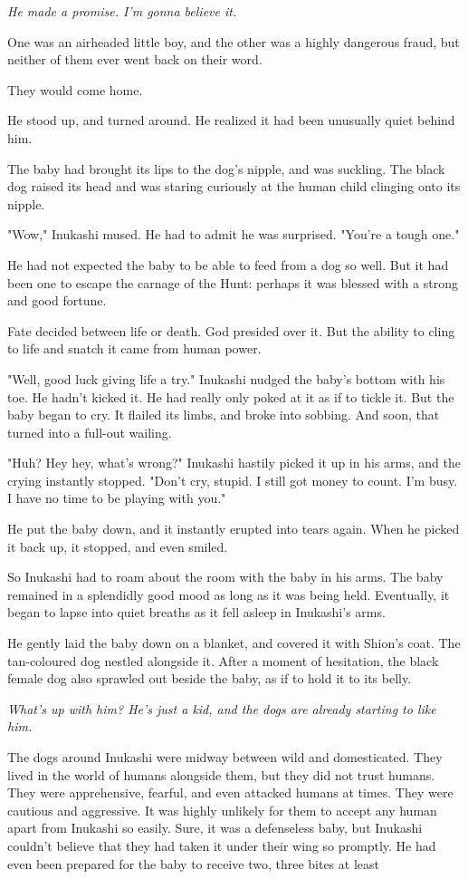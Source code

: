 \emph{He made a promise. I'm gonna believe it.}

One was an airheaded little boy, and the other was a highly dangerous
fraud, but neither of them ever went back on their word.

They would come home.

He stood up, and turned around. He realized it had been unusually quiet
behind him.

The baby had brought its lips to the dog's nipple, and was suckling. The
black dog raised its head and was staring curiously at the human child
clinging onto its nipple.

"Wow," Inukashi mused. He had to admit he was surprised. "You're a tough
one."

He had not expected the baby to be able to feed from a dog so well. But
it had been one to escape the carnage of the Hunt: perhaps it was
blessed with a strong and good fortune.

Fate decided between life or death. God presided over it. But the
ability to cling to life and snatch it came from human power.

"Well, good luck giving life a try." Inukashi nudged the baby's bottom
with his toe. He hadn't kicked it. He had really only poked at it as if
to tickle it. But the baby began to cry. It flailed its limbs, and broke
into sobbing. And soon, that turned into a full-out wailing.

"Huh? Hey hey, what's wrong?" Inukashi hastily picked it up in his arms,
and the crying instantly stopped. "Don't cry, stupid. I still got money
to count. I'm busy. I have no time to be playing with you."

He put the baby down, and it instantly erupted into tears again. When he
picked it back up, it stopped, and even smiled.

So Inukashi had to roam about the room with the baby in his arms. The
baby remained in a splendidly good mood as long as it was being held.
Eventually, it began to lapse into quiet breaths as it fell asleep in
Inukashi's arms.

He gently laid the baby down on a blanket, and covered it with Shion's
coat. The tan-coloured dog nestled alongside it. After a moment of
hesitation, the black female dog also sprawled out beside the baby, as
if to hold it to its belly.

\emph{What's up with him? He's just a kid, and the dogs are already starting
to like him.}

The dogs around Inukashi were midway between wild and domesticated. They
lived in the world of humans alongside them, but they did not trust
humans. They were apprehensive, fearful, and even attacked humans at
times. They were cautious and aggressive. It was highly unlikely for
them to accept any human apart from Inukashi so easily. Sure, it was a
defenseless baby, but Inukashi couldn't believe that they had taken it
under their wing so promptly. He had even been prepared for the baby to
receive two, three bites at least\el 

